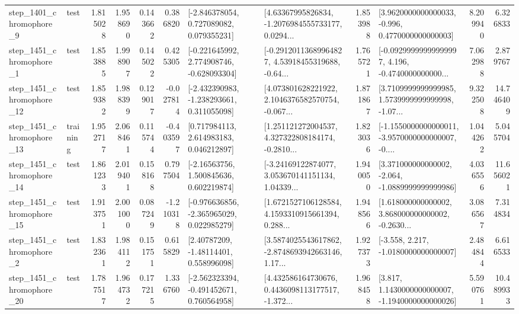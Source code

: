 \begin{tabular}{llrrrrllrlrr}
  step\_1401\_chromophore\_9 &      test &      1.815028 &    1.958690 &      0.143662 &  0.386820 &    [-2.846378054, 0.727089082, 0.079355231] &  [4.63367995826834, -1.2076984555733177, 0.0294... &       1.853988 &   [3.9620000000000033, -0.996, 0.4770000000000003] &            8.209940 &          6.326833 \\
  step\_1451\_chromophore\_1 &      test &      1.853885 &    1.998907 &      0.145022 &  0.425305 &   [-0.221645992, 2.774908746, -0.628093304] &  [-0.29120113689964827, 4.53918455319688, -0.64... &       1.765721 &  [-0.09299999999999997, 4.196, -0.4740000000000... &            7.062988 &          2.879767 \\
 step\_1451\_chromophore\_12 &      test &      1.859382 &    1.988399 &      0.129017 & -0.027814 &   [-2.432390983, -1.238293661, 0.311055098] &  [4.073801628221922, 2.1046376582570754, -0.067... &       1.871867 &  [3.7109999999999985, 1.5739999999999998, -1.07... &            9.322508 &         14.746409 \\
 step\_1451\_chromophore\_13 &  training &      1.952717 &    2.068461 &      0.115744 & -0.403597 &     [0.717984113, 2.614983183, 0.046212897] &  [1.251121272004537, 4.327322808184174, -0.2810... &       1.823036 &  [-1.1550000000000011, -3.9570000000000007, -0.... &            1.044262 &          5.045704 \\
 step\_1451\_chromophore\_14 &      test &      1.861233 &    2.019401 &      0.158168 &  0.797504 &     [-2.16563756, 1.500845636, 0.602219874] &  [-3.24169122874077, 3.053670141151134, 1.04339... &       1.940050 &   [3.371000000000002, -2.064, -1.0889999999999986] &            4.036556 &         11.656021 \\
 step\_1451\_chromophore\_15 &      test &      1.913751 &    2.001000 &      0.087249 & -1.210318 &   [-0.976636856, -2.365965029, 0.022985279] &  [1.6721527106128584, 4.1593310915661394, 0.288... &       1.948566 &  [1.618000000000002, 3.868000000000002, -0.2630... &            3.086567 &          7.314834 \\
  step\_1451\_chromophore\_2 &      test &      1.832361 &    1.984112 &      0.151751 &  0.615829 &      [2.40787209, -1.48114401, 0.558996098] &  [3.5874025543617862, -2.8748693942663146, 1.17... &       1.927373 &               [-3.558, 2.217, -1.0180000000000007] &            2.484844 &          6.616533 \\
 step\_1451\_chromophore\_20 &      test &      1.787517 &    1.964732 &      0.177215 &  1.336760 &   [-2.562323394, -0.491452671, 0.760564958] &  [4.432586164730676, 0.4436098113177517, -1.372... &       1.968458 &   [3.817, 1.1430000000000007, -1.1940000000000026] &            5.590761 &         10.489933 \\

\end{tabular}
